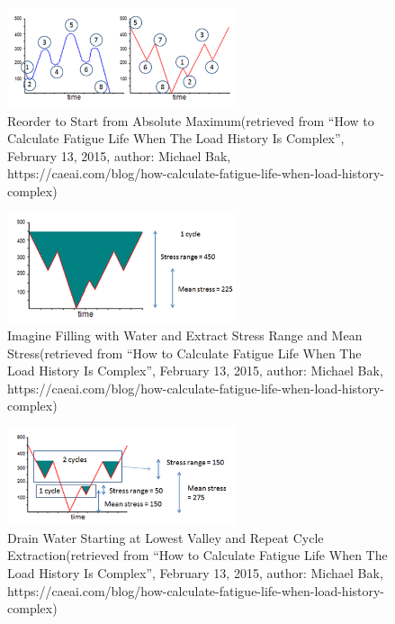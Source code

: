 \begin{figure}[!h]
	\centering
	\includegraphics[width=0.6\textwidth]{figures//Reorder.png} 
	\caption{Reorder to Start from Absolute Maximum(retrieved  from ``How to Calculate Fatigue Life When The Load History Is Complex'', February 13, 2015, author: Michael Bak, https://caeai.com/blog/how-calculate-fatigue-life-when-load-history-complex)}
	\label{Reorder}
\end{figure}

\begin{figure}[!h]
	\centering
	\includegraphics[width=0.6\textwidth]{figures//StressRange.png} 
	\caption{Imagine Filling with Water and Extract Stress Range and Mean Stress(retrieved  from ``How to Calculate Fatigue Life When The Load History Is Complex'', February 13, 2015, author: Michael Bak, https://caeai.com/blog/how-calculate-fatigue-life-when-load-history-complex)}
	\label{StressRange}
\end{figure}

\begin{figure}[!h]
	\centering
	\includegraphics[width=0.6\textwidth]{figures//DrainWater.png} 
	\caption{Drain Water Starting at Lowest Valley and Repeat Cycle Extraction(retrieved  from ``How to Calculate Fatigue Life When The Load History Is Complex'', February 13, 2015, author: Michael Bak, https://caeai.com/blog/how-calculate-fatigue-life-when-load-history-complex)}
	\label{DrainWater}
\end{figure}   


